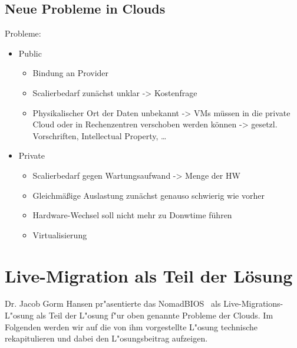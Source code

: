 \documentclass[draft,journal]{IEEEtran}
\begin{document}
\subsection{Neue Probleme in Clouds}
Probleme:
\begin{itemize}
\item Public
  \begin{itemize}
  \item Bindung an Provider
  \item Scalierbedarf zunächst unklar -> Kostenfrage
  \item Physikalischer Ort der Daten unbekannt -> VMs müssen in die
    private Cloud oder in Rechenzentren verschoben werden können ->
    gesetzl. Vorschriften, Intellectual Property, \ldots
  \end{itemize}
\item Private
  \begin{itemize}
  \item Scalierbedarf gegen Wartungsaufwand -> Menge der HW
  \item Gleichmäßige Auslastung zunächst genauso schwierig wie vorher
  \item Hardware-Wechsel soll nicht mehr zu Donwtime führen
  \item Virtualisierung 
  \end{itemize}
\end{itemize}

\section{Live-Migration als Teil der Lösung}
\label{sec:livemigration}
Dr. Jacob Gorm Hansen pr"asentierte das NomadBIOS~\cite{needed} als
Live-Migrations-L"osung als Teil der L"osung f"ur oben genannte
Probleme der Clouds. Im Folgenden werden wir auf die von ihm
vorgestellte L"osung technische rekapitulieren und dabei den
L"osungsbeitrag aufzeigen.
\end{document}
